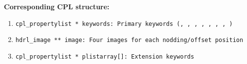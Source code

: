 \begin{datastructdef}
\textbf{Corresponding \ac{CPL} structure:}
\begin{enumerate}
    \item \texttt{cpl\_propertylist * keywords: Primary keywords (,  ,  ,  ,  ,  , , )}
    \item \texttt{hdrl\_image ** image: Four images for each nodding/offset position}
    \item \texttt{cpl\_propertylist * plistarray[]: Extension keywords}
\end{enumerate}
\end{datastructdef}


